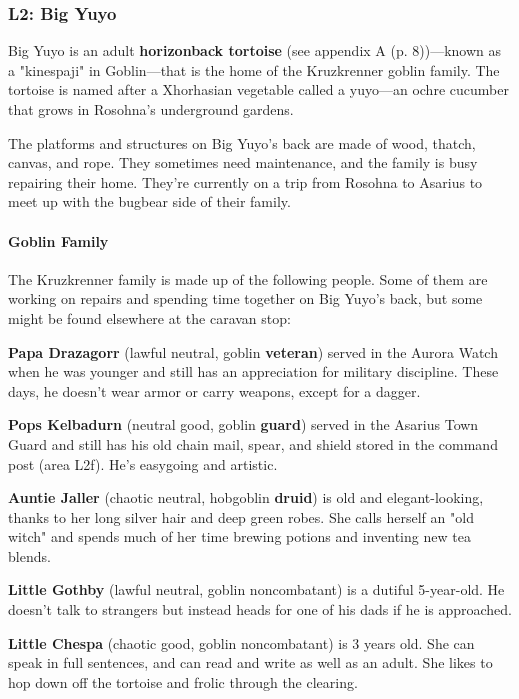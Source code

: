 \documentclass[a4paper, 11pt, bg=full, twocolumn, nooutline]{dndbook}
\begin{document}
\subsubsection{L2: Big Yuyo}

Big Yuyo is an adult \textbf{horizonback tortoise} (see appendix A (p. 8))---known as a "kinespaji" in Goblin---that is the home of the Kruzkrenner goblin family. The tortoise is named after a Xhorhasian vegetable called a yuyo---an ochre cucumber that grows in Rosohna's underground gardens.

The platforms and structures on Big Yuyo's back are made of wood, thatch, canvas, and rope. They sometimes need maintenance, and the family is busy repairing their home. They're currently on a trip from Rosohna to Asarius to meet up with the bugbear side of their family.

\paragraph{Goblin Family}

The Kruzkrenner family is made up of the following people. Some of them are working on repairs and spending time together on Big Yuyo's back, but some might be found elsewhere at the caravan stop:

\textbf{Papa Drazagorr} (lawful neutral, goblin \textbf{veteran}) served in the Aurora Watch when he was younger and still has an appreciation for military discipline. These days, he doesn't wear armor or carry weapons, except for a dagger.

\textbf{Pops Kelbadurn} (neutral good, goblin \textbf{guard}) served in the Asarius Town Guard and still has his old chain mail, spear, and shield stored in the command post (area L2f). He's easygoing and artistic.

\textbf{Auntie Jaller} (chaotic neutral, hobgoblin \textbf{druid}) is old and elegant-looking, thanks to her long silver hair and deep green robes. She calls herself an "old witch" and spends much of her time brewing potions and inventing new tea blends.

\textbf{Little Gothby} (lawful neutral, goblin noncombatant) is a dutiful 5-year-old. He doesn't talk to strangers but instead heads for one of his dads if he is approached.

\textbf{Little Chespa} (chaotic good, goblin noncombatant) is 3 years old. She can speak in full sentences, and can read and write as well as an adult. She likes to hop down off the tortoise and frolic through the clearing.
\end{document}
